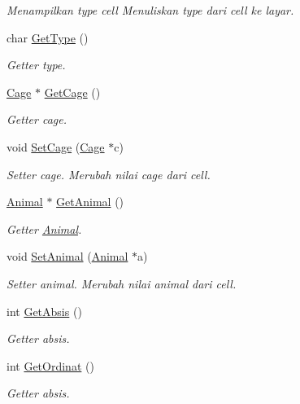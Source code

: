 \begin{DoxyCompactItemize}
\begin{DoxyCompactList}\small\item\em Menampilkan type cell Menuliskan type dari cell ke layar. \end{DoxyCompactList}\item 
char \hyperlink{classCell_abd27056583a21ced96605cab3495481d}{Get\+Type} ()
\begin{DoxyCompactList}\small\item\em Getter type. \end{DoxyCompactList}\item 
\hyperlink{classCage}{Cage} $\ast$ \hyperlink{classCell_a690c7e26b983879381406a0cf5a815a1}{Get\+Cage} ()
\begin{DoxyCompactList}\small\item\em Getter cage. \end{DoxyCompactList}\item 
void \hyperlink{classCell_ae7b402402a5fbd71db91eeed6e2697c8}{Set\+Cage} (\hyperlink{classCage}{Cage} $\ast$c)
\begin{DoxyCompactList}\small\item\em Setter cage. Merubah nilai cage dari cell. \end{DoxyCompactList}\item 
\hyperlink{classAnimal}{Animal} $\ast$ \hyperlink{classCell_aef420cdd18435ea7a2c8d96720fe8e7a}{Get\+Animal} ()
\begin{DoxyCompactList}\small\item\em Getter \hyperlink{classAnimal}{Animal}. \end{DoxyCompactList}\item 
void \hyperlink{classCell_a20c2142de099ddb1f6fa794aa3f5f26d}{Set\+Animal} (\hyperlink{classAnimal}{Animal} $\ast$a)
\begin{DoxyCompactList}\small\item\em Setter animal. Merubah nilai animal dari cell. \end{DoxyCompactList}\item 
int \hyperlink{classCell_a2026adcc21f0b3f6e38e8c50684e641c}{Get\+Absis} ()
\begin{DoxyCompactList}\small\item\em Getter absis. \end{DoxyCompactList}\item 
int \hyperlink{classCell_a5c243fe5ec6b7d879dee6560a72dadf5}{Get\+Ordinat} ()
\begin{DoxyCompactList}\small\item\em Getter absis. \end{DoxyCompactList}\end{DoxyCompactItemize}

